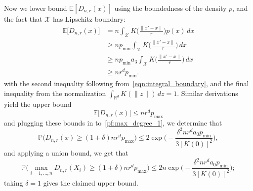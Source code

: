 \documentclass[twoside]{article}
\newcommand{\Reals}{\mathbb{R}}
\newcommand{\1}{\mathbf{1}}
\newcommand{\Rd}{\Reals^d}
\newcommand{\Xset}{\mathcal{X}}
\newcommand{\Pbb}{\mathbb{P}}
\newcommand{\Ebb}{\mathbb{E}}
\theoremstyle{definition}
\theoremstyle{remark}
\begin{document}
Now we lower bound $\Ebb[D_{n,r}(x)]$ using the boundedness of the density $p$, and the fact that $\Xset$ has Lipschitz boundary:
\begin{align*}
\Ebb\bigl[D_{n,r}(x)\bigr] & = n \int_{\Xset} K\biggl(\frac{\|x' - x\|}{r}\biggr) p(x) \,dx \\
& \geq n p_{\min} \int_{\Xset} K\biggl(\frac{\|x' - x\|}{r}\biggr) \,dx \\
& \geq n p_{\min} a_3 \int_{\Xset} K\biggl(\frac{\|x' - x\|}{r}\biggr) \,dx \\
& \geq nr^d p_{\min}.
\end{align*}
with the second inequality following from~\eqref{eqn:integral_boundary}, and the final inequality from the normalization $\int_{\Rd} K(\|z\|) \,dz = 1$. Similar derivations yield the upper bound
\begin{equation*}
\Ebb\bigl[D_{n,r}(x)\bigr] \leq nr^{d} p_{\max}
\end{equation*} 
and plugging these bounds in to~\eqref{pf:max_degree_1}, we determine that
\begin{equation*}
\Pbb\biggl(D_{n,r}(x) \geq (1 + \delta) nr^d p_{\max}\biggr) \leq 2\exp\biggl(-\frac{\delta^2nr^da_0p_{\min}}{3[K(0)]^2}\biggr),
\end{equation*}
and applying a union bound, we get that
\begin{equation*}
\Pbb\biggl(\max_{i = 1,\ldots,n}D_{n,r}(X_i) \geq (1 + \delta) nr^d p_{\max}\biggr) \leq 2n\exp\biggl(-\frac{\delta^2nr^da_0p_{\min}}{3[K(0)]^2}\biggr);
\end{equation*}
taking $\delta = 1$ gives the claimed upper bound.

\clearpage


 
\end{document}
